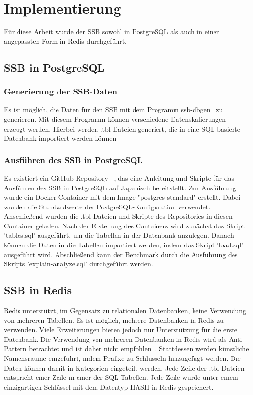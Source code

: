 \chapter{Implementierung}
Für diese Arbeit wurde der \acl{SSB} sowohl in PostgreSQL als auch in einer angepassten Form in Redis durchgeführt.
\section{\acl{SSB} in PostgreSQL}
\subsection{Generierung der \acs{SSB}-Daten}
Es ist möglich, die Daten für den \acl{SSB} mit dem Programm ssb-dbgen~\cite{phillips_electrumssb-dbgen_2023} zu generieren.
Mit diesem Programm können verschiedene Datenskalierungen erzeugt werden.
Hierbei werden .tbl-Dateien generiert, die in eine SQL-basierte Datenbank importiert werden können.
\subsection{Ausführen des \acl{SSB} in PostgreSQL}

Es existiert ein GitHub-Repository ~\cite{nukoyokohama_ssb-postgres_2023}, das eine Anleitung und Skripte für das Ausführen des \ac{SSB} in PostgreSQL auf Japanisch bereitstellt.
Zur Ausführung wurde ein Docker-Container mit dem Image "postgres-standard" erstellt.
Dabei wurden die Standardwerte der PostgreSQL-Konfiguration verwendet.
Anschließend wurden die .tbl-Dateien und Skripte des Repositories in diesen Container geladen. %
Nach der Erstellung des Containers wird zunächst das Skript 'tables.sql' ausgeführt, um die Tabellen in der Datenbank anzulegen.
Danach können die Daten in die Tabellen importiert werden, indem das Skript 'load.sql' ausgeführt wird.
Abschließend kann der Benchmark durch die Ausführung des Skripts 'explain-analyze.sql' durchgeführt werden.

\section{\acs{SSB} in Redis}
Redis unterstützt, im Gegensatz zu relationalen Datenbanken, keine Verwendung von mehreren Tabellen.
Es ist möglich, mehrere Datenbanken in Redis zu verwenden. Viele Erweiterungen bieten jedoch nur Unterstützung für die erste Datenbank.
Die Verwendung von mehreren Datenbanken in Redis wird als Anti-Pattern betrachtet und ist daher nicht empfohlen~\cite{prickett_answer_2022}.
Stattdessen werden künstliche Namensräume eingeführt, indem Präfixe zu Schlüsseln hinzugefügt werden.
Die Daten können damit in Kategorien eingeteilt werden.
Jede Zeile der .tbl-Dateien entspricht einer Zeile in einer der SQL-Tabellen.
Jede Zeile wurde unter einem einzigartigen Schlüssel mit dem Datentyp HASH in Redis gespeichert.


